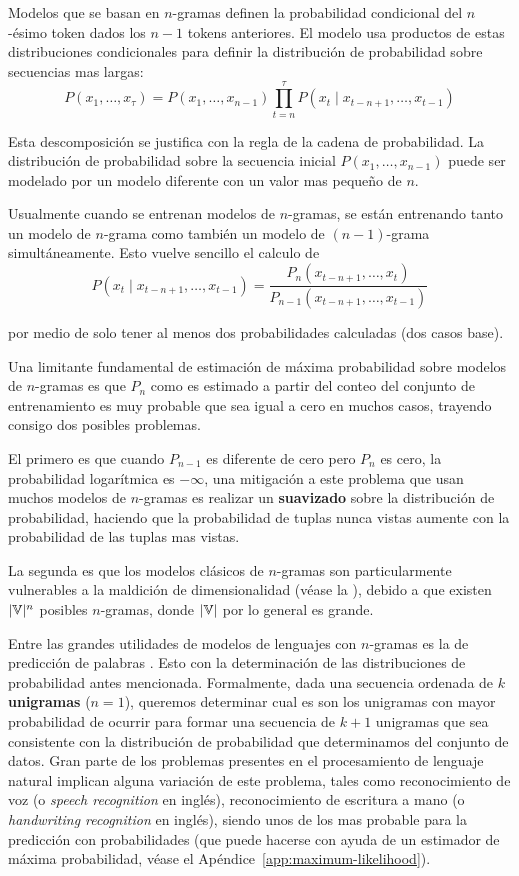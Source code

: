 Modelos que se basan en $n$-gramas definen la probabilidad condicional del $n$-ésimo token dados los $n-1$ tokens anteriores. El modelo usa productos de estas distribuciones condicionales para definir la distribución de probabilidad sobre secuencias mas largas:
\begin{equation}
  P(x_1, \ldots, x_\tau) = P(x_1, \ldots, x_{n-1}) \prod_{t = n}^{\tau} P(x_t \mid x_{t-n+1}, \ldots, x_{t-1})
\end{equation}

Esta descomposición se justifica con la regla de la cadena de probabilidad. La distribución de probabilidad sobre la secuencia inicial $P(x_1, \ldots, x_{n-1})$ puede ser modelado por un modelo diferente con un valor mas pequeño de $n$.

Usualmente cuando se entrenan modelos de $n$-gramas, se están entrenando tanto un modelo de $n$-grama como también un modelo de $(n-1)$-grama simultáneamente. Esto vuelve sencillo el calculo de
\begin{equation}
  P(x_t \mid x_{t-n+1}, \ldots, x_{t-1}) = \frac{P_n(x_{t-n+1}, \ldots, x_t)}{P_{n-1}(x_{t-n+1}, \ldots, x_{t-1})}
\end{equation}

por medio de solo tener al menos dos probabilidades calculadas (dos casos base).

Una limitante fundamental de estimación de máxima probabilidad sobre modelos de $n$-gramas es que $P_n$ como es estimado a partir del conteo del conjunto de entrenamiento es muy probable que sea igual a cero en muchos casos, trayendo consigo dos posibles problemas.

El primero es que cuando $P_{n-1}$ es diferente de cero pero $P_n$ es cero, la probabilidad logarítmica es $-\infty$, una mitigación a este problema que usan muchos modelos de $n$-gramas es realizar un \textbf{suavizado} sobre la distribución de probabilidad, haciendo que la probabilidad de tuplas nunca vistas aumente con la probabilidad de las tuplas mas vistas.

La segunda es que los modelos clásicos de $n$-gramas son particularmente vulnerables a la maldición de dimensionalidad (véase la ), debido a que existen $|{\mathbb{V}}|^n$ posibles $n$-gramas, donde $|{\mathbb{V}}|$ por lo general es grande.

Entre las grandes utilidades de modelos de lenguajes con $n$-gramas es la de predicción de palabras \cite{jurafsky-martin}. Esto con la determinación de las distribuciones de probabilidad antes mencionada. Formalmente, dada una secuencia ordenada de $k$ \textbf{unigramas} ($n=1$), queremos determinar cual es son los unigramas con mayor probabilidad de ocurrir para formar una secuencia de $k+1$ unigramas que sea consistente con la distribución de probabilidad que determinamos del conjunto de datos. Gran parte de los problemas presentes en el procesamiento de lenguaje natural implican alguna variación de este problema, tales como reconocimiento de voz (o \textsl{speech recognition} en inglés), reconocimiento de escritura a mano (o \textsl{handwriting recognition} en inglés), siendo unos de los mas probable para la predicción con probabilidades (que puede hacerse con ayuda de un estimador de máxima probabilidad, véase el Apéndice~\ref{app:maximum-likelihood}).

